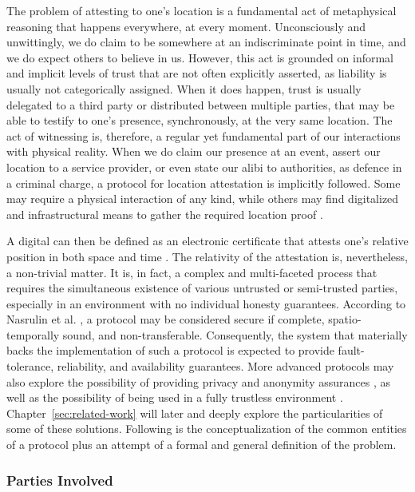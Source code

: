 The problem of attesting to one's location is a fundamental act of metaphysical reasoning that happens everywhere, at every moment. Unconsciously and unwittingly, we do claim to be somewhere at an indiscriminate point in time, and we do expect others to believe in us. However, this act is grounded on informal and implicit levels of trust that are not often explicitly asserted, as liability is usually not categorically assigned. When it does happen, trust is usually delegated to a third party or distributed between multiple parties, that may be able to testify to one's presence, synchronously, at the very same location. The act of witnessing is, therefore, a regular yet fundamental part of our interactions with physical reality. When we do claim our presence at an event, assert our location to a service provider, or even state our alibi to authorities, as defence in a criminal charge, a protocol for location attestation is implicitly followed. Some may require a physical interaction of any kind, while others may find digitalized and infrastructural means to gather the required location proof \cite{luo2010veriplace}.

A digital \pol{} can then be defined as an electronic certificate that attests one's relative position in both space and time \cite{amoretti2018blockchain}. The relativity of the attestation is, nevertheless, a non-trivial matter. It is, in fact, a complex and multi-faceted process that requires the simultaneous existence of various untrusted or semi-trusted parties, especially in an environment with no individual honesty guarantees. According to Nasrulin et al. \cite{nasrulin2018robust}, a \pol{} protocol may be considered secure if complete, spatio-temporally sound, and non-transferable. Consequently, the system that materially backs the implementation of such a protocol is expected to provide fault-tolerance, reliability, and availability guarantees. More advanced protocols may also explore the possibility of providing privacy and anonymity assurances \cite{li2020privacy}, as well as the possibility of being used in a fully trustless environment \cite{amoretti2018blockchain}. Chapter~\ref{sec:related-work} will later and deeply explore the particularities of some of these solutions. Following is the conceptualization of the common entities of a \pol{} protocol plus an attempt of a formal and general definition of the problem.

\subsubsection{Parties Involved}

